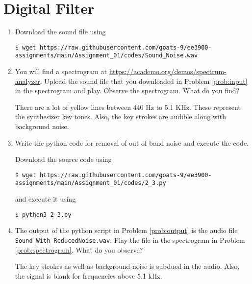 \documentclass[journal,12pt,twocolumn]{IEEEtran}
\renewcommand\thesection{\arabic{section}}
\begin{document}
\section{Digital Filter}
\begin{enumerate}[label=\thesection.\arabic*
,ref=\thesection.\theenumi]
\item
\label{prob:input}
Download the sound file using
\begin{lstlisting}
$ wget https://raw.githubusercontent.com/goats-9/ee3900-assignments/main/Assignment_01/codes/Sound_Noise.wav
\end{lstlisting}
\item
\label{prob:spectrogram}
You will find a spectrogram at \href{https://academo.org/demos/spectrum-analyzer}{\url{https://academo.org/demos/spectrum-analyzer}}. Upload the sound file that you downloaded in Problem \ref{prob:input} in the spectrogram and play. Observe the spectrogram. What do you find?

\solution There are a lot of yellow lines between 440 Hz to 5.1 KHz.  These represent the synthesizer key tones. Also, the key strokes
are audible along with background noise.
\item
\label{prob:output}
Write the python code for removal of out of band noise and execute the code.

\solution
Download the source code using
\begin{lstlisting}
$ wget https://raw.githubusercontent.com/goats-9/ee3900-assignments/main/Assignment_01/codes/2_3.py
\end{lstlisting}
and execute it using
\begin{lstlisting}
$ python3 2_3.py
\end{lstlisting}
\item
The output of the python script in Problem \ref{prob:output} is the audio file \texttt{Sound\_With\_ReducedNoise.wav}. Play the file in the spectrogram in Problem \ref{prob:spectrogram}. What do you observe?

\solution The key strokes as well as background noise is subdued in the audio. Also, the signal is blank for frequencies above 5.1 kHz.

\end{enumerate}
\end{document}

